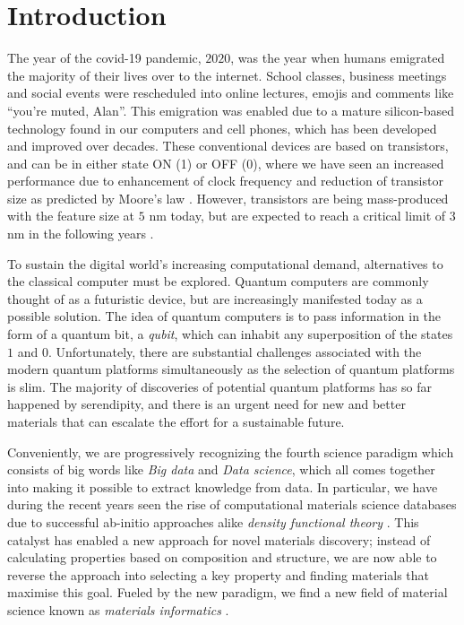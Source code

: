 \chapter{Introduction}

The year of the covid-19 pandemic, $2020$, was the year when humans emigrated the majority of their lives over to the internet. School classes, business meetings and social events were rescheduled into online lectures, emojis and comments like ``you're muted, Alan''. This emigration was enabled due to a mature silicon-based technology found in our computers and cell phones, which has been developed and improved over decades. These conventional devices are based on transistors, and can be in either state ON (1) or OFF (0), where we have seen an increased performance due to enhancement of clock frequency and reduction of transistor size as predicted by Moore's law \cite{Moore1965, Pavicic2006}. However, transistors are being mass-produced with the feature size at $5$ nm today, but are expected to reach a critical limit of $3$ nm in the following years \cite{Gwennap2020}.



To sustain the digital world's increasing computational demand, alternatives to the classical computer must be explored. Quantum computers are commonly thought of as a futuristic device, but are increasingly manifested today as a possible solution. The idea of quantum computers is to pass information in the form of a quantum bit, a \textit{qubit}, which can inhabit any superposition of the states $1$ and $0$. Unfortunately, there are substantial challenges associated with the modern quantum platforms simultaneously as the selection of quantum platforms is slim. The majority of discoveries of potential quantum platforms has so far happened by serendipity, and there is an urgent need for new and better materials that can escalate the effort for a sustainable future.

Conveniently, we are progressively recognizing the fourth science paradigm which consists of big words like \textit{Big data} and \textit{Data science}, which all comes together into making it possible to extract knowledge from data. In particular, we have during the recent years seen the rise of computational materials science databases \cite{Curtarolo2012, Curtarolo2012a, Calderon2015, Jain2013, Saal2013, Kirklin2015, Choudhary2020, Allen1987} due to successful ab-initio approaches alike \textit{density functional theory} \cite{Kohn1965}. This catalyst has enabled a new approach for novel materials discovery; instead of calculating properties based on composition and structure, we are now able to reverse the approach into selecting a key property and finding materials that maximise this goal.
Fueled by the new paradigm, we find a new field of material science known as \textit{materials informatics} \cite{Rajan2005}.

